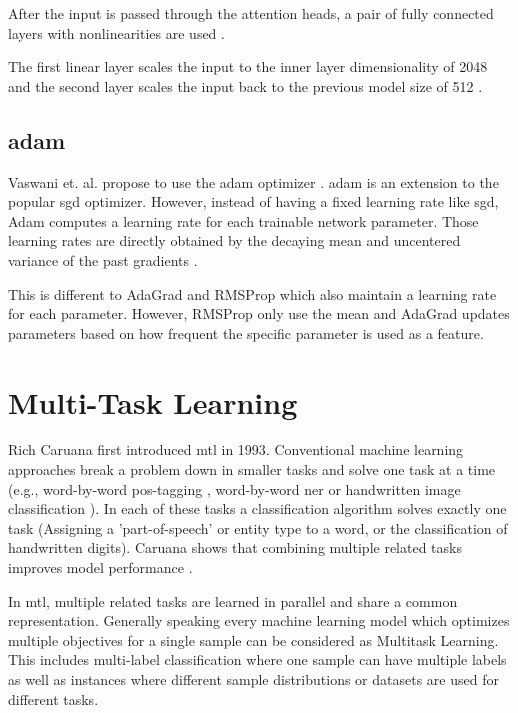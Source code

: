 After the input is passed through the attention heads, a pair of fully connected layers with nonlinearities are used \cite{Vaswani2017d}. 

The first linear layer scales the input to the inner layer dimensionality of 2048 and the second layer scales the input back to the previous model size of 512 \cite{Vaswani2017d}.

\subsection{\gls{adam}}

Vaswani et. al. propose to use the \acrfull{adam} optimizer \cite{Kingma2014}. \gls{adam} is an extension to the popular \gls{sgd} optimizer. However, instead of having a fixed learning rate like \gls{sgd}, Adam computes a learning rate for each trainable network parameter. Those learning rates are directly obtained by the decaying mean and uncentered variance of the past gradients \cite{Kingma2014}.
\medskip

This is different to AdaGrad \cite{Duchi2011} and RMSProp \cite{Hinton} which also maintain a learning rate for each parameter. However, RMSProp only use the mean and AdaGrad updates parameters based on how frequent the specific parameter is used as a feature.

\section{Multi-Task Learning}

Rich Caruana first introduced \acrfull{mtl} in 1993. Conventional machine learning approaches break a problem down in smaller tasks and solve one task at a time (e.g., word-by-word \gls{pos}-tagging \cite{Toutanova2007}, word-by-word \gls{ner} \cite{Sang2003} or handwritten image classification \cite{LeCun;1990}). In each of these tasks a classification algorithm solves exactly one task (Assigning a 'part-of-speech' or entity type to a word, or the classification of handwritten digits). Caruana shows that combining multiple related tasks improves model performance \cite{Caruana1993}\cite{Caruana1997a}. 

In \gls{mtl}, multiple related tasks are learned in parallel and share a common representation. Generally speaking every machine learning model which optimizes multiple objectives for a single sample can be considered as Multitask Learning. This includes multi-label classification where one sample can have multiple labels as well as instances where different sample distributions or datasets are used for different tasks.

